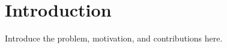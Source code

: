 \section{Introduction}
\label{sec:introduction}

Introduce the problem, motivation, and contributions here.

